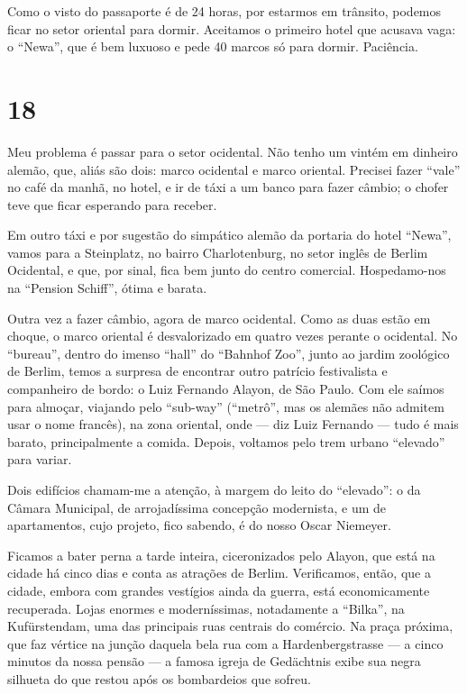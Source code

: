 Como o visto do passaporte é de 24 horas, por estarmos em trânsito, podemos ficar no setor oriental para dormir. Aceitamos o primeiro hotel que acusava vaga: o ``Newa'', que é bem luxuoso e pede 40 marcos só para dormir. Paciência.

\section*{18 \adfflatleafright {}}
Meu problema é passar para o setor ocidental. Não tenho um vintém em dinheiro alemão, que, aliás são dois: marco ocidental e marco oriental. Precisei fazer ``vale'' no café da manhã, no hotel, e ir de táxi a um banco para fazer câmbio; o chofer teve que ficar esperando para receber.

Em outro táxi e por sugestão do simpático alemão da portaria do hotel ``Newa'', vamos para a Steinplatz, no bairro Charlotenburg, no setor inglês de Berlim Ocidental, e que, por sinal, fica bem junto do centro comercial. Hospedamo-nos na ``Pension Schiff'', ótima e barata.

Outra vez a fazer câmbio, agora de marco ocidental. Como as duas estão em choque, o marco oriental é desvalorizado em quatro vezes perante o ocidental. No ``bureau'', dentro do imenso ``hall'' do ``Bahnhof Zoo'', junto ao jardim zoológico de Berlim, temos a surpresa de encontrar outro patrício festivalista e companheiro de bordo: o Luiz Fernando Alayon, de São Paulo. Com ele saímos para almoçar, viajando pelo ``sub-way'' (``metrô'', mas os alemães não admitem usar o nome francês), na zona oriental, onde --- diz Luiz Fernando --- tudo é mais barato, principalmente a comida. Depois, voltamos pelo trem urbano ``elevado'' para variar.

Dois edifícios chamam-me a atenção, à margem do leito do ``elevado'': o da Câmara Municipal, de arrojadíssima concepção modernista, e um de apartamentos, cujo projeto, fico sabendo, é do nosso Oscar Niemeyer.

Ficamos a bater perna a tarde inteira, ciceronizados pelo Alayon, que está na cidade há cinco dias e conta as atrações de Berlim. Verificamos, então, que a cidade, embora com grandes vestígios ainda da guerra, está economicamente recuperada. Lojas enormes e moderníssimas, notadamente a ``Bilka'', na Kufürstendam, uma das principais ruas centrais do comércio. Na praça próxima, que faz vértice na junção daquela bela rua com a Hardenbergstrasse --- a cinco minutos da nossa pensão --- a famosa igreja de Gedächtnis exibe sua negra silhueta do que restou após os bombardeios que sofreu.

